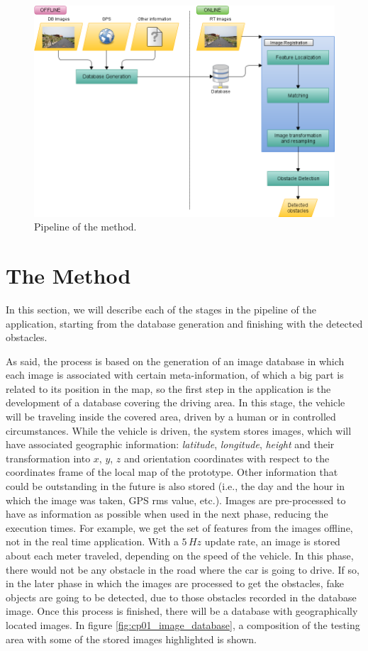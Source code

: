 \begin{figure}[thb]
  \centering
  \includegraphics{pipeline}
  \caption{Pipeline of the method.}
  \label{fig:cp01_pipeline}
\end{figure}

\section{The Method}\label{ch:chapter01_01}

In this section, we will describe each of the stages in the pipeline of the application, starting from the database generation and finishing with the detected obstacles. 

As said, the process is based on the generation of an image database in which each image is associated with certain meta-information, of which a big part is related to its position in the map, so the first step in the application is the development of a database covering the driving area. In this stage, the vehicle will be traveling inside the covered area, driven by a human or in controlled circumstances. While the vehicle is driven, the system stores images, which will have associated geographic information: \emph{latitude}, \emph{longitude}, \emph{height} and their transformation into $x$, $y$, $z$ and orientation coordinates with respect to the coordinates frame of the local map of the prototype. Other information that could be outstanding in the future is also stored (i.e., the day and the hour in which the image was taken, \ac{GPS} rms value, etc.). Images are pre-processed to have as information as possible when used in the next phase, reducing the execution times. For example, we get the set of features from the images offline, not in the real time application. With a $5\,Hz$ update rate, an image is stored about each meter traveled, depending on the speed of the vehicle. In this phase, there would not be any obstacle in the road where the car is going to drive. If so, in the later phase in which the images are processed to get the obstacles, fake objects are going to be detected, due to those obstacles recorded in the database image. Once this process is finished, there will be a database with geographically located images. In figure \ref{fig:cp01_image_database}, a composition of the testing area with some of the stored images highlighted is shown.

